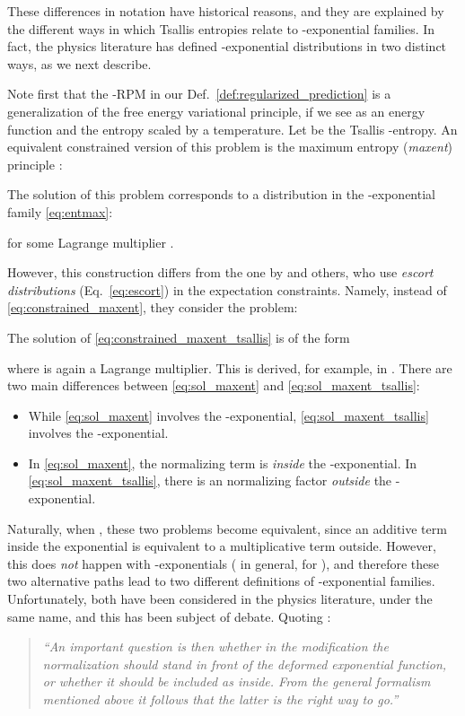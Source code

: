 \documentclass{article}
\begin{document}
These differences in notation have historical reasons, and they are explained by the different ways in which Tsallis entropies relate to -exponential families. 
In fact, the physics literature has defined -exponential distributions in two distinct ways, as we next describe. 

Note first that the -RPM in our  Def.~\ref{def:regularized_prediction} is a generalization of the free energy variational principle, if we see  as an energy function and  the entropy scaled by a temperature. 
Let  be the Tsallis -entropy. 
An equivalent constrained version of this problem is the maximum entropy ({\it maxent}) principle \citep{jaynes1957information}:

The solution of this problem corresponds to a distribution in the -exponential family \eqref{eq:entmax}:

for some Lagrange multiplier . 

However, this construction differs from the one by \citet{Tsallis1988} and others, who use {\it escort distributions} (Eq.~\ref{eq:escort}) in the expectation constraints. Namely, instead of \eqref{eq:constrained_maxent}, they consider the problem:

The solution of \eqref{eq:constrained_maxent_tsallis} is of the form

where  is again a Lagrange multiplier. This is derived, for example, in \citep[Eq.~15]{abe2003geometry}. 
There are two main differences between \eqref{eq:sol_maxent} and \eqref{eq:sol_maxent_tsallis}:
\begin{itemize}
    \item While \eqref{eq:sol_maxent} involves the -exponential, \eqref{eq:sol_maxent_tsallis} involves the -exponential.
    \item In \eqref{eq:sol_maxent}, the normalizing term  is {\it inside} the -exponential. In \eqref{eq:sol_maxent_tsallis}, there is an normalizing factor  {\it outside} the -exponential. 
\end{itemize}
Naturally, when , these two problems become equivalent, since an additive term inside the exponential is equivalent to a multiplicative term outside. However, this does {\it not} happen with -exponentials ( in general, for ), and therefore these two alternative paths lead to two different definitions of -exponential families. Unfortunately, both have been considered in the physics literature, under the same name, and  
this has been subject of debate. Quoting \citet[\S 1]{naudts2009q}: 

\begin{quote}
{\it ``An important question is then whether in the modification the normalization should stand in front of the deformed exponential function, or whether it should be included as  inside. From the general formalism mentioned above it follows
that the latter is the right way to go.''}
\end{quote}
\end{document}
